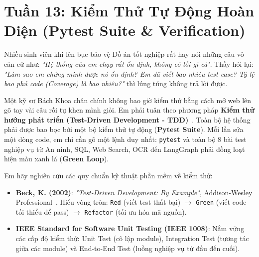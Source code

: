 ﻿\section{Tuần 13: Kiểm Thử Tự Động Hoàn Diện (Pytest Suite \& Verification)}
\label{sec:tuan_13}

\begin{advisorbox}
Nhiều sinh viên khi lên bục bảo vệ Đồ án tốt nghiệp rất hay nói những câu vô căn cứ như: \textit{"Hệ thống của em chạy rất ổn định, không có lỗi gì cả"}. Thầy hỏi lại: \textit{"Làm sao em chứng minh được nó ổn định? Em đã viết bao nhiêu test case? Tỷ lệ bao phủ code (Coverage) là bao nhiêu?"} thì lúng túng không trả lời được.

Một kỹ sư Bách Khoa chân chính không bao giờ kiểm thử bằng cách mở web lên gõ tay vài câu rồi tự khen mình giỏi. Em phải tuân theo phương pháp \textbf{Kiểm thử hướng phát triển (Test-Driven Development - TDD)}~\cite{beck2002test}. Toàn bộ hệ thống phải được bao bọc bởi một bộ kiểm thử tự động (\textbf{Pytest Suite}). Mỗi lần sửa một dòng code, em chỉ cần gõ một lệnh duy nhất: \texttt{pytest} và toàn bộ 8 bài test nghiệp vụ từ An ninh, SQL, Web Search, OCR đến LangGraph phải đồng loạt hiện màu xanh lá (\textbf{Green Loop}).
\end{advisorbox}

\begin{literaturebox}
Em hãy nghiên cứu các quy chuẩn kỹ thuật phần mềm về kiểm thử:
\begin{itemize}[leftmargin=1.5em]
    \item \textbf{Beck, K. (2002)}: \textit{"Test-Driven Development: By Example"}, Addison-Wesley Professional~\cite{beck2002test}. Hiểu vòng tròn: \texttt{Red} (viết test thất bại) $\rightarrow$ \texttt{Green} (viết code tối thiểu để pass) $\rightarrow$ \texttt{Refactor} (tối ưu hóa mã nguồn).
    \item \textbf{IEEE Standard for Software Unit Testing (IEEE 1008)}: Nắm vững các cấp độ kiểm thử: Unit Test (cô lập module), Integration Test (tương tác giữa các module) và End-to-End Test (luồng nghiệp vụ từ đầu đến cuối).
\end{itemize}
\end{literaturebox}

